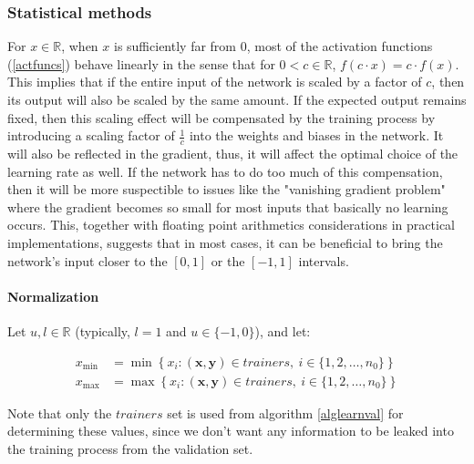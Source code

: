 \documentclass[titlepage]{article}
\begin{document}
      \subsubsection{Statistical methods}

        For $x \in \mathbb{R}$, when $x$ is sufficiently far from $0$, most of
        the activation functions (\ref{actfuncs}) behave linearly in the sense
        that for $0 < c \in \mathbb{R}$, $f(c \cdot x) = c \cdot f(x)$. This
        implies that if the entire input of the network is scaled by a factor of
        $c$, then its output will also be scaled by the same amount. If the
        expected output remains fixed, then this scaling effect will be
        compensated by the training process by introducing a scaling factor of
        $\frac{1}{c}$ into the weights and biases in the network. It will also
        be reflected in the gradient, thus, it will affect the optimal choice
        of the learning rate as well. If the network has to do too much of this
        compensation, then it will be more suspectible to issues like the
        "vanishing gradient problem" where the gradient becomes so small for
        most inputs that basically no learning occurs. This, together with
        floating point arithmetics considerations in practical implementations,
        suggests that in most cases, it can be beneficial to bring the network's
        input closer to the $[0, 1]$ or the $[-1, 1]$ intervals.

        \paragraph{Normalization}

          Let $u, l \in \mathbb{R}$ (typically, $l = 1$ and $u \in \{-1, 0\}$),
          and let:

          \begin{align*}
            x_{\min} & = \min\left\{
              x_i : (\mathbf{x}, \mathbf{y}) \in trainers,
                    \ i \in \{1, 2, \dots, n_0\}
            \right\} \\
            x_{\max} & = \max\left\{
              x_i : (\mathbf{x}, \mathbf{y}) \in trainers,
                    \ i \in \{1, 2, \dots, n_0\}
            \right\}
          \end{align*}

          Note that only the $trainers$ set is used from algorithm
          \ref{alglearnval} for determining these values, since we don't want
          any information to be leaked into the training process from the
          validation set.
\end{document}
